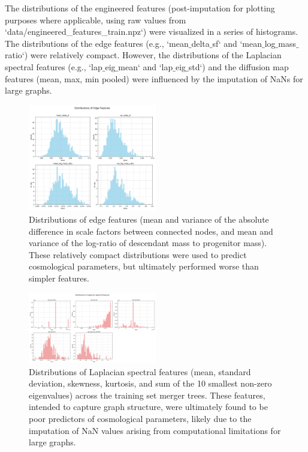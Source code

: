 \documentclass[twocolumn]{aastex631}
\begin{document}
The distributions of the engineered features (post-imputation for plotting purposes where applicable, using raw values from `data/engineered\_features\_train.npz`) were visualized in a series of histograms. The distributions of the edge features (e.g., `mean\ensuremath{\_}delta\ensuremath{\_}sf` and `mean\ensuremath{\_}log\ensuremath{\_}mass\ensuremath{\_}ratio`) were relatively compact. However, the distributions of the Laplacian spectral features (e.g., `lap\ensuremath{\_}eig\ensuremath{\_}mean` and `lap\ensuremath{\_}eig\ensuremath{\_}std`) and the diffusion map features (mean, max, min pooled) were influenced by the imputation of NaNs for large graphs.

\begin{figure}[h!]
    \centering
    \includegraphics[width=0.5\textwidth]{../input_files/plots/engineered_feature_dist_edge_1_20250527-135752.png}
    \caption{Distributions of edge features (mean and variance of the absolute difference in scale factors between connected nodes, and mean and variance of the log-ratio of descendant mass to progenitor mass). These relatively compact distributions were used to predict cosmological parameters, but ultimately performed worse than simpler features.}
    \label{fig:edge_feature_dist}
\end{figure}

\begin{figure}[h!]
    \centering
    \includegraphics[width=0.5\textwidth]{../input_files/plots/engineered_feature_dist_laplacian_2_20250527-135752.png}
    \caption{Distributions of Laplacian spectral features (mean, standard deviation, skewness, kurtosis, and sum of the 10 smallest non-zero eigenvalues) across the training set merger trees. These features, intended to capture graph structure, were ultimately found to be poor predictors of cosmological parameters, likely due to the imputation of NaN values arising from computational limitations for large graphs.}
    \label{fig:laplacian_feature_dist}
\end{figure}
\end{document}
